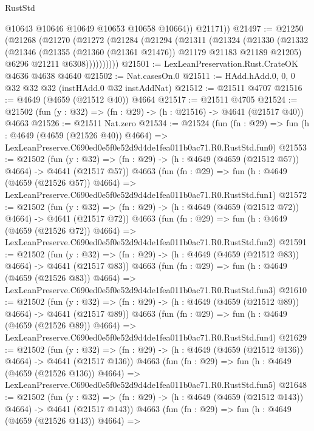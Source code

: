 \begin{lexlean}{RustStd}
\begin{coremodule}
            @10643
            @10646
            @10649
            @10653
            @10658
            @10664))
        @21171))
@21497 := @21250
    (@21268
      (@21270
        (@21272
          (@21284
            (@21294
              (@21311
                (@21324
                  (@21330
                    (@21332
                      (@21346
                        (@21355 (@21360 (@21361 @21476)) @21179 @21183 @21189 @21205)
                        @6296
                        @21211
                        @6308))))))))))
@21501 := LexLeanPreservation.Rust.CrateOK @4636 @4638 @4640
@21502 := Nat.casesOn.{0}
@21511 := HAdd.hAdd.{0, 0, 0} @32 @32 @32 (instHAdd.{0} @32 instAddNat)
@21512 := @21511 @4707
@21516 := @4649 (@4659 (@21512 @40)) @4664
@21517 := @21511 @4705
@21524 := @21502 (fun (y : @32) => (fn : @29) -> (h : @21516) -> @4641 (@21517 @40)) @4663
@21526 := @21511 Nat.zero
@21534 := @21524
    (fun (fn : @29) =>
    fun (h : @4649 (@4659 (@21526 @40)) @4664) =>
    LexLeanPreserve.C690ed0e5f0e52d9d4de1fea011b0ac71.R0.RustStd.fun0)
@21553 := @21502
    (fun (y : @32) => (fn : @29) -> (h : @4649 (@4659 (@21512 @57)) @4664) -> @4641 (@21517 @57))
    @4663
    (fun (fn : @29) =>
    fun (h : @4649 (@4659 (@21526 @57)) @4664) =>
    LexLeanPreserve.C690ed0e5f0e52d9d4de1fea011b0ac71.R0.RustStd.fun1)
@21572 := @21502
    (fun (y : @32) => (fn : @29) -> (h : @4649 (@4659 (@21512 @72)) @4664) -> @4641 (@21517 @72))
    @4663
    (fun (fn : @29) =>
    fun (h : @4649 (@4659 (@21526 @72)) @4664) =>
    LexLeanPreserve.C690ed0e5f0e52d9d4de1fea011b0ac71.R0.RustStd.fun2)
@21591 := @21502
    (fun (y : @32) => (fn : @29) -> (h : @4649 (@4659 (@21512 @83)) @4664) -> @4641 (@21517 @83))
    @4663
    (fun (fn : @29) =>
    fun (h : @4649 (@4659 (@21526 @83)) @4664) =>
    LexLeanPreserve.C690ed0e5f0e52d9d4de1fea011b0ac71.R0.RustStd.fun3)
@21610 := @21502
    (fun (y : @32) => (fn : @29) -> (h : @4649 (@4659 (@21512 @89)) @4664) -> @4641 (@21517 @89))
    @4663
    (fun (fn : @29) =>
    fun (h : @4649 (@4659 (@21526 @89)) @4664) =>
    LexLeanPreserve.C690ed0e5f0e52d9d4de1fea011b0ac71.R0.RustStd.fun4)
@21629 := @21502
    (fun (y : @32) => (fn : @29) -> (h : @4649 (@4659 (@21512 @136)) @4664) -> @4641 (@21517 @136))
    @4663
    (fun (fn : @29) =>
    fun (h : @4649 (@4659 (@21526 @136)) @4664) =>
    LexLeanPreserve.C690ed0e5f0e52d9d4de1fea011b0ac71.R0.RustStd.fun5)
@21648 := @21502
    (fun (y : @32) => (fn : @29) -> (h : @4649 (@4659 (@21512 @143)) @4664) -> @4641 (@21517 @143))
    @4663
    (fun (fn : @29) =>
    fun (h : @4649 (@4659 (@21526 @143)) @4664) =>

\end{coremodule}
\end{lexlean}
